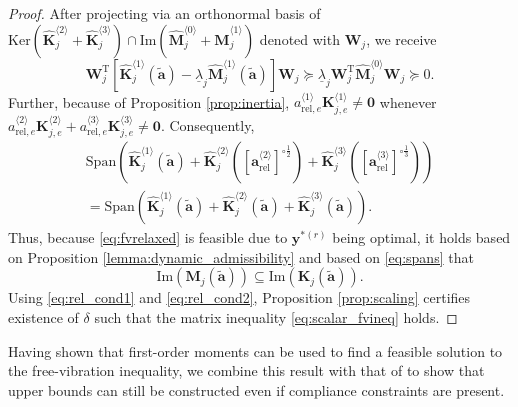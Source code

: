 \documentclass[final,onefignum,onetabnum]{siamart220329}
\newtheorem*{proof}{Proof}%
\begin{document}
\begin{proof}
    After projecting via an orthonormal basis of $\mathrm{Ker}\left(\hat{\mathbf{K}}_j^{\langle 2\rangle} + \hat{\mathbf{K}}_j^{\langle 3\rangle}\right) \cap \mathrm{Im}\left(\hat{\mathbf{M}}_j^{\langle 0\rangle} + \hat{\mathbf{M}}_j^{\langle 1\rangle}\right)$ denoted with $\mathbf{W}_j$, we receive
	\begin{equation}\label{eq:rel_cond1}
		\mathbf{W}_j^\mathrm{T}\left[\hat{\mathbf{K}}_{j}^{\langle 1\rangle}(\tilde{\mathbf{a}}) - \underline{\lambda}_j \hat{\mathbf{M}}_{j}^{\langle 1\rangle}(\tilde{\mathbf{a}}) \right]\mathbf{W}_j \succeq \underline{\lambda}_j \mathbf{W}_j^\mathrm{T} \hat{\mathbf{M}}_{j}^{\langle 0\rangle}\mathbf{W}_j \succeq 0.
	\end{equation}
	Further, because of Proposition \ref{prop:inertia}, {$a_{\mathrm{rel},e}^{\langle 1 \rangle} \mathbf{K}_{j,e}^{\langle 1\rangle}\neq \mathbf{0}$} whenever {$a_{\mathrm{rel},e}^{\langle2\rangle} \mathbf{K}_{j,e}^{\langle 2\rangle} + a_{\mathrm{rel},e}^{\langle3 \rangle} \mathbf{K}_{j,e}^{\langle 3\rangle} \neq \mathbf{0}$}. Consequently, 
	\begin{multline}\label{eq:spans}
		\mathrm{Span}\left(\hat{\mathbf{K}}_j^{\langle 1\rangle} (\tilde{\mathbf{a}}) + \hat{\mathbf{K}}_j^{\langle 2\rangle}\left(\left[\mathbf{a}_{\mathrm{rel}}^{\langle 2\rangle}\right]^{\circ\frac{1}{2}}\right) + \hat{\mathbf{K}}_j^{\langle 3\rangle}\left(\left[\mathbf{a}_{\mathrm{rel}}^{\langle 3\rangle}\right]^{\circ\frac{1}{3}}\right)\right)\\ = \mathrm{Span}\left(\hat{\mathbf{K}}_j^{\langle 1 \rangle} (\tilde{\mathbf{a}}) + \hat{\mathbf{K}}_j^{\langle 2\rangle}(\tilde{\mathbf{a}}) + \hat{\mathbf{K}}_j^{{\langle 3\rangle}}(\tilde{\mathbf{a}}) \right).
	\end{multline}
	Thus, because \eqref{eq:fvrelaxed} is feasible due to $\mathbf{y}^{*(r)}$ being optimal, it holds based on Proposition \ref{lemma:dynamic_admissibility} and based on \eqref{eq:spans} that 
	\begin{equation}\label{eq:rel_cond2}
		\mathrm{Im}\left(\mathbf{M}_j(\tilde{\mathbf{a}})\right) \subseteq \mathrm{Im}\left(\mathbf{K}_j(\tilde{\mathbf{a}})\right).
	\end{equation}
	Using \eqref{eq:rel_cond1} and \eqref{eq:rel_cond2}, Proposition \ref{prop:scaling} certifies existence of $\delta$ such that the matrix inequality \eqref{eq:scalar_fvineq} holds.
\end{proof}

Having shown that first-order moments can be used to find a feasible solution to the free-vibration inequality, we combine this result with that of \cite{Tyburec2023} to show that upper bounds can still be constructed even if compliance constraints are present.
\end{document}
